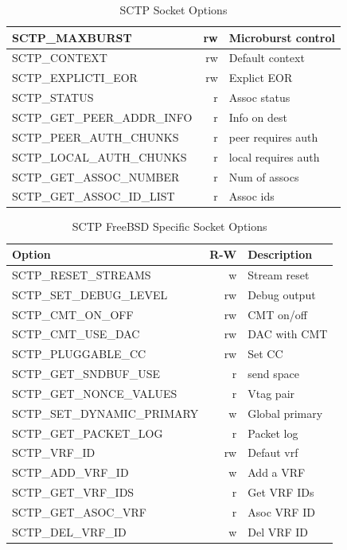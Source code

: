 \documentclass[conference]{IEEEtran}
\begin{document}
\begin{table}
\begin{tabular}{|l|r|l|}
\hline
SCTP\_MAXBURST & rw & Microburst control\\
\hline
SCTP\_CONTEXT & rw & Default context\\
\hline
SCTP\_EXPLICTI\_EOR & rw & Explict EOR\\
\hline
SCTP\_STATUS & r & Assoc status\\
\hline
SCTP\_GET\_PEER\_ADDR\_INFO & r & Info on dest\\
\hline
SCTP\_PEER\_AUTH\_CHUNKS & r & peer requires auth\\
\hline
SCTP\_LOCAL\_AUTH\_CHUNKS & r & local requires auth\\
\hline
SCTP\_GET\_ASSOC\_NUMBER & r & Num of assocs\\
\hline
SCTP\_GET\_ASSOC\_ID\_LIST & r & Assoc ids\\
\hline
\end{tabular}
\caption{SCTP Socket Options\label{sockopt}}
\end{table}

\begin{table}
\begin{tabular}{|l|r|l|}
\hline
Option & R-W & Description\\
\hline \hline
SCTP\_RESET\_STREAMS & w & Stream reset\\
\hline
SCTP\_SET\_DEBUG\_LEVEL & rw & Debug output\\
\hline
SCTP\_CMT\_ON\_OFF & rw & CMT on/off\\
\hline
SCTP\_CMT\_USE\_DAC & rw & DAC with CMT\\
\hline
SCTP\_PLUGGABLE\_CC & rw & Set CC\\
\hline
SCTP\_GET\_SNDBUF\_USE & r &  send space\\
\hline
SCTP\_GET\_NONCE\_VALUES & r & Vtag pair\\
\hline
SCTP\_SET\_DYNAMIC\_PRIMARY & w & Global primary\\
\hline
SCTP\_GET\_PACKET\_LOG & r & Packet log \\
\hline
SCTP\_VRF\_ID & rw & Defaut vrf\\
\hline
SCTP\_ADD\_VRF\_ID & w & Add a VRF\\
\hline
SCTP\_GET\_VRF\_IDS & r & Get VRF IDs\\
\hline
SCTP\_GET\_ASOC\_VRF & r & Asoc VRF ID\\
\hline
SCTP\_DEL\_VRF\_ID & w & Del VRF ID\\
\hline
\end{tabular}
\caption{SCTP FreeBSD Specific Socket Options\label{bsdsockopt}}
\end{table}
\end{document}
